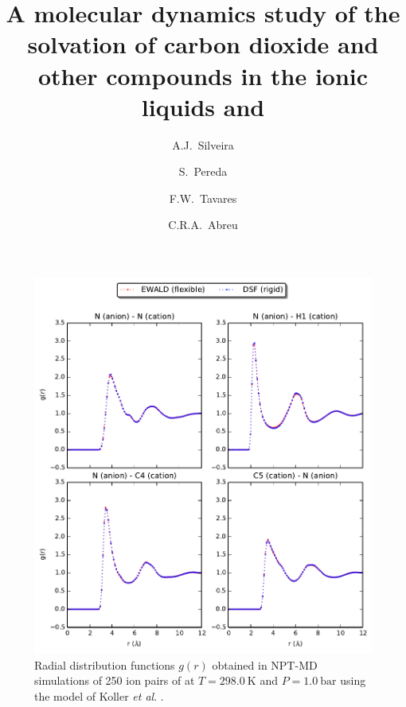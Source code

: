 \documentclass[3p,onecolumn]{elsarticle}
\begin{document}
\begin{frontmatter}

\title{A molecular dynamics study of the solvation of carbon dioxide and other compounds in the ionic liquids \ce{[emim][B(CN)_4]} and \ce{[emim][NTf_2]}}

\author[plapiqui]{A.J.~Silveira}
\author[plapiqui]{S.~Pereda}
\author[eq-ufrj,coppe-ufrj]{F.W.~Tavares}
\author[eq-ufrj]{C.R.A.~Abreu}

\address[plapiqui]{Planta Piloto de Ingenier\'ia Qu\'imica (PLAPIQUI), Universidad Nacional del Sur, Bah\'ia Blanca, Argentina}
\address[eq-ufrj]{Chemical Engineering Department, Escola de Qu\'imica, Universidade Federal do Rio de Janeiro, Rio de Janeiro, Brazil}
\address[coppe-ufrj]{Chemical Engineering Program, Alberto Luiz Coimbra Institute for Graduate Studies and Research in Engineering (COPPE), Universidade Federal do Rio de Janeiro, Rio de Janeiro, Brazil}


\end{frontmatter}

\begin{figure}[ht]
\includegraphics[]{rdf-koller}
\caption{Radial distribution functions $g(r)$ obtained in NPT-MD simulations of 250 ion pairs of \ce{[emim][B(CN)4]} at $T = 298.0~\mathrm{K}$ and $P = 1.0~\mathrm{bar}$ using the model of Koller \textit{et al}. \cite{Koller_2012}.}
\label{fig:rdf-koller}
\end{figure}
\end{document}
